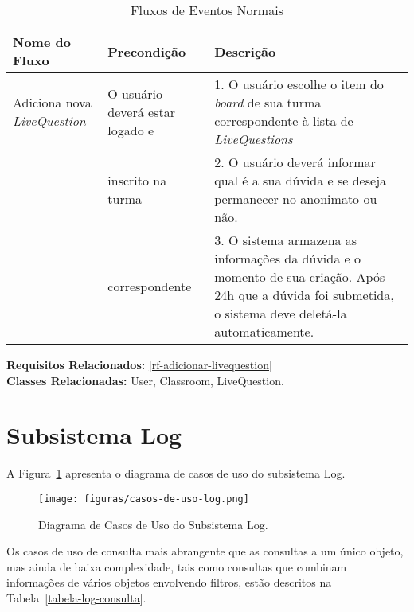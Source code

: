 \begin{table}[H]
	\centering \vspace{0.5cm} \footnotesize
	\caption{Fluxos de Eventos Normais}
	\begin{tabular}{|p{2.3cm}|p{2.5cm}|p{10cm}|} \hline  \rowcolor[rgb]{0.8,0.8,0.8}
		
		Nome do Fluxo & Precondição & Descrição  \\ \hline		
		
		Adiciona nova \textit{LiveQuestion}& O usuário deverá estar logado e & 1. O usuário escolhe o item do \textit{board} de sua turma correspondente à lista de \textit{LiveQuestions}  \\
		{}    &  inscrito na turma  & 2. O usuário deverá informar qual é a sua dúvida e se deseja permanecer no anonimato ou não.\\
		{}    & correspondente & 3. O sistema armazena as informações da dúvida e o momento de sua criação. Após 24h que a dúvida foi submetida, o sistema deve deletá-la automaticamente. \\ \hline
		
		
	\end{tabular}
\end{table}



\noindent  \textbf{Requisitos Relacionados:} \ref{rf-adicionar-livequestion}      \\ \textbf{Classes Relacionadas:} User, Classroom, LiveQuestion.

\newpage

\section{Subsistema Log}

A Figura~\ref{figura-caso-de-uso-log} apresenta o diagrama de casos de uso do subsistema Log.

\begin{figure}[h!]
	\centering
	\texttt{[image: figuras/casos-de-uso-log.png]}
	\caption{Diagrama de Casos de Uso do Subsistema Log.}
	\label{figura-caso-de-uso-log}
\end{figure}

Os casos de uso de consulta mais abrangente que as consultas a um único objeto, mas ainda de baixa complexidade, tais como consultas que combinam informações de vários objetos envolvendo filtros, estão descritos na Tabela~\ref{tabela-log-consulta}.

